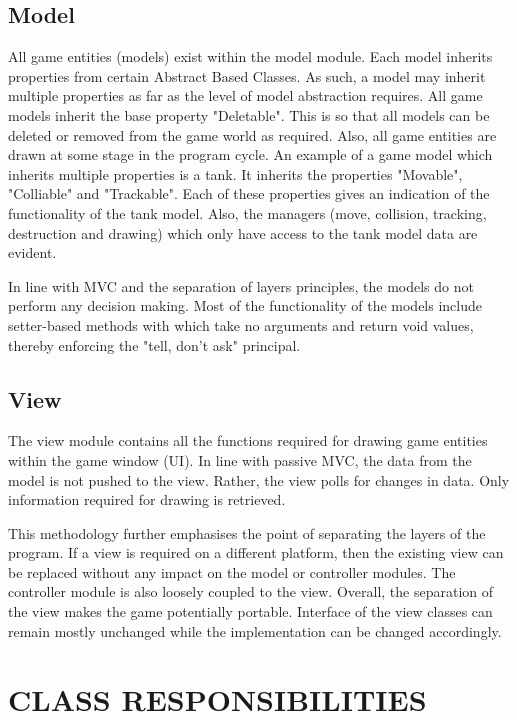 \documentclass[10pt,twocolumn]{witseiepaper}
\begin{document}
\subsection{Model}
All game entities (models) exist within the model module. Each model inherits properties from certain Abstract Based Classes. As such, a model may inherit multiple properties as far as the level of model abstraction requires. All game models inherit the base property "Deletable". This is so that all models can be deleted or removed from the game world as required. Also, all game entities are drawn at some stage in the program cycle. An example of a game model which inherits multiple properties is a tank. It inherits the properties "Movable", "Colliable" and "Trackable". Each of these properties gives an indication of the functionality of the tank model. Also, the managers (move, collision, tracking, destruction and drawing) which only have access to the tank model data are evident.

In line with MVC and the separation of layers principles, the models do not perform any decision making. Most of the functionality of the models include setter-based methods with which take no arguments and return void values, thereby enforcing the "tell, don't ask" principal.

\subsection{View}
The view module contains all the functions required for drawing game entities within the game window (UI). In line with passive MVC, the data from the model is not pushed to the view. Rather, the view polls for changes in data. Only information required for drawing is retrieved. 

This methodology further emphasises the point of separating the layers of the program. If a view is required on a different platform, then the existing view can be replaced without any impact on the model or controller modules. The controller module is also loosely coupled to the view. Overall, the separation of the view makes the game potentially portable. Interface of the view classes can remain mostly unchanged while the implementation can be changed accordingly.

%
\section{CLASS RESPONSIBILITIES} %
\end{document}
